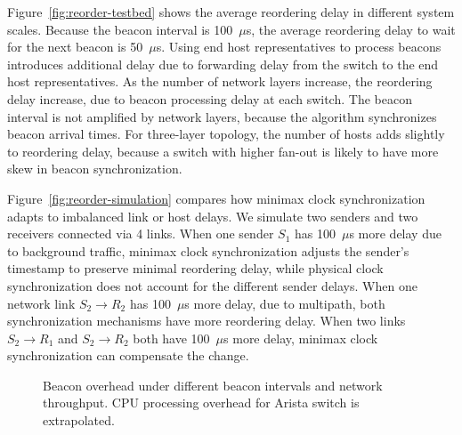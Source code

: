 Figure~\ref{fig:reorder-testbed} shows the average reordering delay in different system scales.
Because the beacon interval is 100~$\mu$s, the average reordering delay to wait for the next beacon is 50~$\mu$s.
Using end host representatives to process beacons introduces additional delay due to forwarding delay from the switch to the end host representatives.
As the number of network layers increase, the reordering delay increase, due to beacon processing delay at each switch.
The beacon interval is not amplified by network layers, because the algorithm synchronizes beacon arrival times.
For three-layer topology, the number of hosts adds slightly to reordering delay, because a switch with higher fan-out is likely to have more skew in beacon synchronization.

Figure~\ref{fig:reorder-simulation} compares how minimax clock synchronization adapts to imbalanced link or host delays.
We simulate two senders and two receivers connected via 4 links.
When one sender $S_1$ has 100~$\mu$s more delay due to background traffic, minimax clock synchronization adjusts the sender's timestamp to preserve minimal reordering delay, while physical clock synchronization does not account for the different sender delays.
When one network link $S_2 \rightarrow R_2$ has 100~$\mu$s more delay, due to multipath, both synchronization mechanisms have more reordering delay.
When two links $S_2 \rightarrow R_1$ and $S_2 \rightarrow R_2$ both have 100~$\mu$s more delay, minimax clock synchronization can compensate the change.



\begin{figure}[t]
\centering
	\hspace{0.01\textwidth}
	\caption{
		Beacon overhead under different beacon intervals and network throughput.
		CPU processing overhead for Arista switch is extrapolated.
	}
\label{fig:overhead}
\end{figure}


